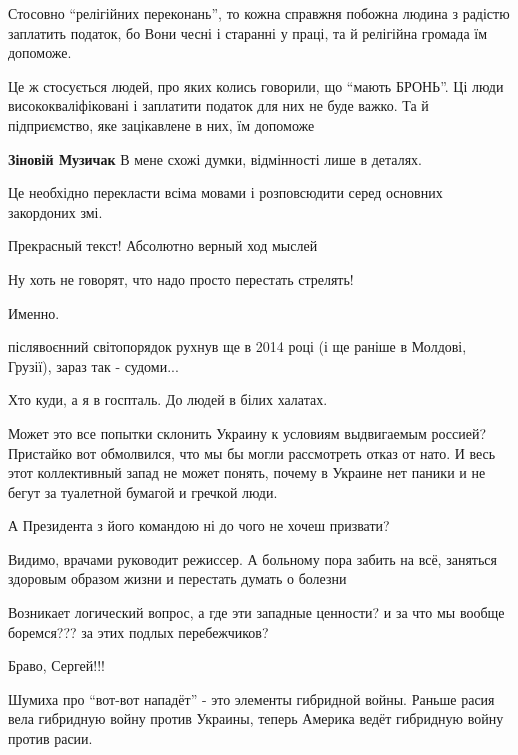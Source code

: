\begin{itemize}
Стосовно \enquote{релігійних переконань}, то кожна справжня побожна людина з
радістю заплатить податок, бо Вони чесні і старанні у праці, та й релігійна
громада їм допоможе.

Це ж стосується людей, про яких колись говорили, що \enquote{мають БРОНЬ}. Ці
люди висококваліфіковані і заплатити податок для них не буде важко. Та й
підприємство, яке зацікавлене в них, їм допоможе

\textbf{Зіновій Музичак} В мене схожі думки, відмінності лише в деталях.

Це необхідно перекласти всіма мовами і розповсюдити серед основних закордоних змі.

Прекрасный текст! Абсолютно верный ход мыслей

Ну хоть не говорят, что надо просто перестать стрелять!

Именно.


післявоєнний світопорядок рухнув ще в 2014 році (і ще раніше в Молдові,
Грузії), зараз так - судоми...

Хто куди, а я в госпталь. До людей в білих халатах.


Может это все попытки склонить Украину к условиям выдвигаемым россией?
Пристайко вот обмолвился, что мы бы могли рассмотреть отказ от нато. И весь
этот коллективный запад не может понять, почему в Украине нет паники и не бегут
за туалетной бумагой и гречкой люди.


А Президента з його командою ні до чого не хочеш призвати?


Видимо, врачами руководит режиссер. А больному пора забить на всё, заняться
здоровым образом жизни и перестать думать о болезни


Возникает логический вопрос, а где эти западные ценности? и за что мы вообще
боремся??? за этих подлых перебежчиков?

Браво, Сергей!!!


Шумиха про \enquote{вот-вот нападёт} - это элементы гибридной войны. Раньше расия вела
гибридную войну против Украины, теперь Америка ведёт гибридную войну против
расии.


\end{itemize}
